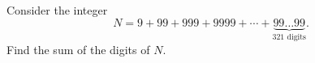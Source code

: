 Consider the integer $$N = 9 + 99 + 999 + 9999 + \cdots + \underbrace{99\ldots 99}_\text{321 digits}.$$Find the sum of the digits of $N$.
